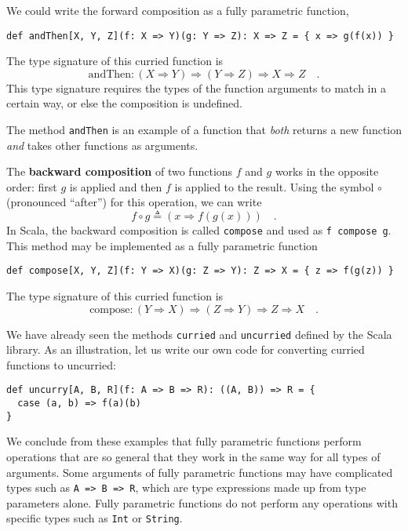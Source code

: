 We could write the forward composition as a fully parametric function,
\begin{lstlisting}
def andThen[X, Y, Z](f: X => Y)(g: Y => Z): X => Z = { x => g(f(x)) }
\end{lstlisting}
The type signature of this curried function is 
\[
\text{andThen}:\left(X\Rightarrow Y\right)\Rightarrow\left(Y\Rightarrow Z\right)\Rightarrow X\Rightarrow Z\quad.
\]
This type signature requires the types of the function arguments to
match in a certain way, or else the composition is undefined.

The method \lstinline!andThen!
is an example of a function that \emph{both} returns a new function
\emph{and} takes other functions as arguments.

The \textbf{backward composition} of
two functions $f$ and $g$ works in the opposite order: first $g$
is applied and then $f$ is applied to the result. Using the symbol
$\circ$ (pronounced ``after'') for this operation, we can write
\begin{equation}
f\circ g\triangleq\left(x\Rightarrow f(g(x))\right)\quad.\label{eq:def-of-backward-composition}
\end{equation}
In Scala, the backward composition is called \lstinline!compose!
and used as \lstinline!f compose g!.
This method may be implemented as a fully parametric function
\begin{lstlisting}
def compose[X, Y, Z](f: Y => X)(g: Z => Y): Z => X = { z => f(g(z)) }
\end{lstlisting}
The type signature of this curried function is
\[
\text{compose}:\left(Y\Rightarrow X\right)\Rightarrow\left(Z\Rightarrow Y\right)\Rightarrow Z\Rightarrow X\quad.
\]

We have already seen the methods \lstinline!curried!
and \lstinline!uncurried!
defined by the Scala library. As an illustration, let us write our
own code for converting curried functions to uncurried:
\begin{lstlisting}
def uncurry[A, B, R](f: A => B => R): ((A, B)) => R = {
  case (a, b) => f(a)(b)
}
\end{lstlisting}
We conclude from these examples that fully parametric functions perform
operations that are so general that they work in the same way for
all types of arguments. Some arguments of fully parametric functions
may have complicated types such as \lstinline!A => B => R!,
which are type expressions made up from type parameters alone. Fully
parametric functions do not perform any operations with specific types
such as \lstinline!Int!
or \lstinline!String!.

